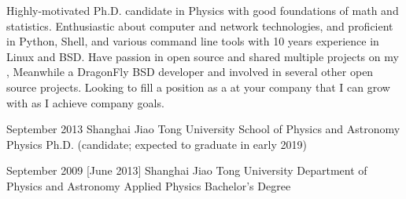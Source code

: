 \documentclass{resume}
\begin{document}
\makeheader

Highly-motivated Ph.D. candidate in Physics with good foundations of
math and statistics.
Enthusiastic about computer and network technologies,
and proficient in Python, Shell, and various command line tools with
10 years experience in Linux and BSD.
Have passion in open source and shared multiple projects on my
,
Meanwhile a DragonFly BSD developer and involved in several other
open source projects.
Looking to fill a position as a \textbf{\getposition}
at your company that I can grow with as I achieve company goals.

\begin{competences}[10em]
\end{competences}

\begin{educations}
  \education%
    {September 2013}%
    {Shanghai Jiao Tong University}%
    {School of Physics and Astronomy}%
    {Physics}%
    {Ph.D. (candidate; expected to graduate in early 2019)}

  \separator{0.5em}
  \education%
    {September 2009}%
    [June 2013]%
    {Shanghai Jiao Tong University}%
    {Department of Physics and Astronomy}%
    {Applied Physics}%
    {Bachelor's Degree}
\end{educations}
\end{document}
